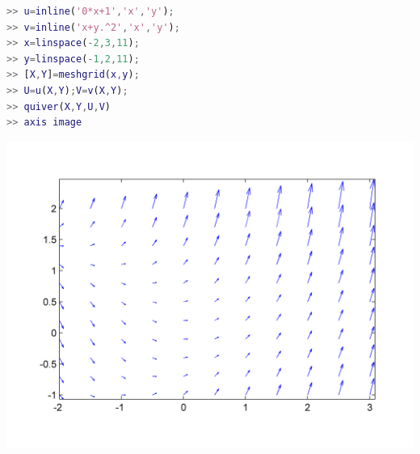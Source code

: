 \begin{lstlisting}[language=Matlab]
>> u=inline('0*x+1','x','y'); 
>> v=inline('x+y.^2','x','y'); 
>> x=linspace(-2,3,11); 
>> y=linspace(-1,2,11); 
>> [X,Y]=meshgrid(x,y); 
>> U=u(X,Y);V=v(X,Y); 
>> quiver(X,Y,U,V) 
>> axis image 
\end{lstlisting}

\includegraphics[width=400pt]{./Imagenes/vectorial1.png}